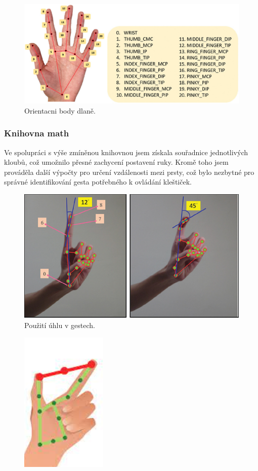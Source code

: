 \documentclass[12pt, a4paper,
twoside,        %
openright
]{report}
\begin{document}
{\begin{figure}[h]
	
	\centering
	\includegraphics[width=0.8\linewidth]{image/orientacniBody.jpg} 
	
	
	\caption{Orientacni body dlaně.} %
	\label{fig:obvod} %
\end{figure}

\subsubsection{Knihovna math}

Ve spolupráci s výše zmíněnou knihovnou jsem získala souřadnice jednotlivých kloubů, což umožnilo přesné zachycení postavení ruky. Kromě toho jsem prováděla další výpočty pro určení vzdálenosti mezi prsty, což bylo nezbytné pro správné identifikování gesta potřebného k ovládání kleštiček.

\begin{figure}[h]
	
	\centering
	\includegraphics[width=0.4\linewidth]{image/prikladGesta.PNG} 
	
	
	\caption{Použití úhlu v gestech.} %
	\label{fig:uhlyVGestech} %
\end{figure}
\begin{figure}[h]
	
	\centering
	\includegraphics[width=0.2\linewidth]{image/vzdalenost.PNG} 
	

\end{figure}}
\end{document}
